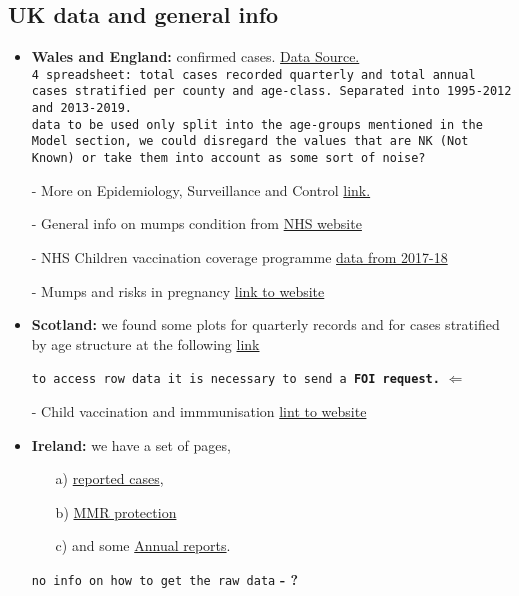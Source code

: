 \documentclass[a4paper, 12pt]{article}
\begin{document}
\subsection*{UK data and general info}
\begin{itemize}
    \item \textbf{Wales and England:} confirmed cases.
    \href{https://www.gov.uk/government/publications/mumps-confirmed-cases}{Data Source.}\\
    \texttt{4 spreadsheet: total cases recorded quarterly and total annual cases stratified per county and age-class. Separated into 1995-2012 and 2013-2019. \CheckmarkBold} \\
    \texttt{data to be used only split into the age-groups mentioned in the Model section, we could disregard the values that are NK (Not Known) or take them into account as some sort of noise?}
    
    - More on Epidemiology, Surveillance and Control
    \href{https://www.gov.uk/government/collections/mumps-guidance-data-and-analysis}{link.}
    
    
    - General info on mumps condition from \href{https://www.nhs.uk/conditions/mumps/}{NHS website}
    
    
    - NHS Children vaccination coverage programme \href{https://digital.nhs.uk/data-and-information/publications/statistical/nhs-immunisation-statistics/england-2017-18}{data from 2017-18}
    
    
    - Mumps and risks in pregnancy \href{https://www.gov.uk/government/publications/mumps-risk-in-pregnancy-infection-in-healthcare-settings-and-mmr-vaccine/mumps-risk-in-pregnancy-infection-in-healthcare-settings-and-mmr-vaccine}{link to website}
    \item \textbf{Scotland: } we found some plots for quarterly records and for cases stratified by age structure at the following \href{https://www.hps.scot.nhs.uk/a-to-z-of-topics/mumps/}{link}
    
    \texttt{to access row data it is necessary to send a \textbf{FOI request.}} \textbf{$\Leftarrow$}
    
    - Child vaccination and immmunisation \href{https://www.isdscotland.org/Health-Topics/Child-Health/Immunisation/}{lint to website}
    
    \item \textbf{Ireland: } we have a set of pages, 
    \begin{itemize}
        \item[a)] \href{https://www.hpsc.ie/a-z/vaccinepreventable/mumps/}{reported cases}, 
        \item[b)] \href{https://www.hpsc.ie/a-z/vaccinepreventable/mmr-protectionagainstmeaslesmumpsrubella/}{MMR protection} 
        \item[c)] and some \href{https://www.hpsc.ie/a-z/vaccinepreventable/mumps/publications/annualreports/}{Annual reports}.
    \end{itemize} 
    \texttt{no info on how to get the raw data} \textbf{- ?}
\end{itemize}
\end{document}
